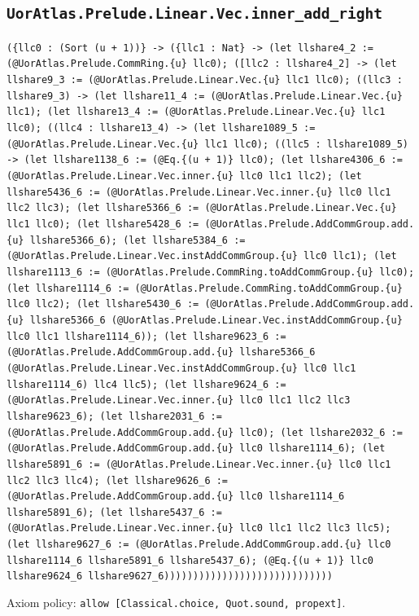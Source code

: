 \documentclass[11pt]{article}
\begin{document}
\subsection*{\texttt{UorAtlas.Prelude.Linear.Vec.inner\_add\_right}}
\noindent\texttt{(\{llc0 : (Sort (u + 1))\} -> (\{llc1 : Nat\} -> (let llshare4\_2 := (@UorAtlas.Prelude.CommRing.\{u\} llc0); ([llc2 : llshare4\_2] -> (let llshare9\_3 := (@UorAtlas.Prelude.Linear.Vec.\{u\} llc1 llc0); ((llc3 : llshare9\_3) -> (let llshare11\_4 := (@UorAtlas.Prelude.Linear.Vec.\{u\} llc1); (let llshare13\_4 := (@UorAtlas.Prelude.Linear.Vec.\{u\} llc1 llc0); ((llc4 : llshare13\_4) -> (let llshare1089\_5 := (@UorAtlas.Prelude.Linear.Vec.\{u\} llc1 llc0); ((llc5 : llshare1089\_5) -> (let llshare1138\_6 := (@Eq.\{(u + 1)\} llc0); (let llshare4306\_6 := (@UorAtlas.Prelude.Linear.Vec.inner.\{u\} llc0 llc1 llc2); (let llshare5436\_6 := (@UorAtlas.Prelude.Linear.Vec.inner.\{u\} llc0 llc1 llc2 llc3); (let llshare5366\_6 := (@UorAtlas.Prelude.Linear.Vec.\{u\} llc1 llc0); (let llshare5428\_6 := (@UorAtlas.Prelude.AddCommGroup.add.\{u\} llshare5366\_6); (let llshare5384\_6 := (@UorAtlas.Prelude.Linear.Vec.instAddCommGroup.\{u\} llc0 llc1); (let llshare1113\_6 := (@UorAtlas.Prelude.CommRing.toAddCommGroup.\{u\} llc0); (let llshare1114\_6 := (@UorAtlas.Prelude.CommRing.toAddCommGroup.\{u\} llc0 llc2); (let llshare5430\_6 := (@UorAtlas.Prelude.AddCommGroup.add.\{u\} llshare5366\_6 (@UorAtlas.Prelude.Linear.Vec.instAddCommGroup.\{u\} llc0 llc1 llshare1114\_6)); (let llshare9623\_6 := (@UorAtlas.Prelude.AddCommGroup.add.\{u\} llshare5366\_6 (@UorAtlas.Prelude.Linear.Vec.instAddCommGroup.\{u\} llc0 llc1 llshare1114\_6) llc4 llc5); (let llshare9624\_6 := (@UorAtlas.Prelude.Linear.Vec.inner.\{u\} llc0 llc1 llc2 llc3 llshare9623\_6); (let llshare2031\_6 := (@UorAtlas.Prelude.AddCommGroup.add.\{u\} llc0); (let llshare2032\_6 := (@UorAtlas.Prelude.AddCommGroup.add.\{u\} llc0 llshare1114\_6); (let llshare5891\_6 := (@UorAtlas.Prelude.Linear.Vec.inner.\{u\} llc0 llc1 llc2 llc3 llc4); (let llshare9626\_6 := (@UorAtlas.Prelude.AddCommGroup.add.\{u\} llc0 llshare1114\_6 llshare5891\_6); (let llshare5437\_6 := (@UorAtlas.Prelude.Linear.Vec.inner.\{u\} llc0 llc1 llc2 llc3 llc5); (let llshare9627\_6 := (@UorAtlas.Prelude.AddCommGroup.add.\{u\} llc0 llshare1114\_6 llshare5891\_6 llshare5437\_6); (@Eq.\{(u + 1)\} llc0 llshare9624\_6 llshare9627\_6)))))))))))))))))))))))))))))}\par
\noindent Axiom policy: \texttt{allow [Classical.choice, Quot.sound, propext]}.\par
\end{document}
